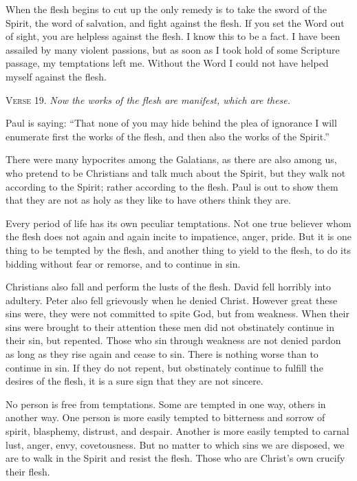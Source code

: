 When the flesh begins to cut up the only remedy is to take the sword of the Spirit, the word of salvation, and fight against the flesh. If you set the Word out of sight, you are helpless against the flesh. I know this to be a fact. I have been assailed by many violent passions, but as soon as I took hold of some Scripture passage, my temptations left me. Without the Word I could not have helped myself against the flesh.

\textsc{Verse} 19. \emph{Now the works of the flesh are manifest, which are these.}

Paul is saying: “That none of you may hide behind the plea of ignorance I will enumerate first the works of the flesh, and then also the works of the Spirit.”

There were many hypocrites among the Galatians, as there are also among us, who pretend to be Christians and talk much about the Spirit, but they walk not according to the Spirit; rather according to the flesh. Paul is out to show them that they are not as holy as they like to have others think they are.

Every period of life has its own peculiar temptations. Not one true believer whom the flesh does not again and again incite to impatience, anger, pride. But it is one thing to be tempted by the flesh, and another thing to yield to the flesh, to do its bidding without fear or remorse, and to continue in sin.

Christians also fall and perform the lusts of the flesh. David fell horribly into adultery. Peter also fell grievously when he denied Christ. However great these sins were, they were not committed to spite God, but from weakness. When their sins were brought to their attention these men did not obstinately continue in their sin, but repented. Those who sin through weakness are not denied pardon as long as they rise again and cease to sin. There is nothing worse than to continue in sin. If they do not repent, but obstinately continue to fulfill the desires of the flesh, it is a sure sign that they are not sincere.

No person is free from temptations. Some are tempted in one way, others in another way. One person is more easily tempted to bitterness and sorrow of spirit, blasphemy, distrust, and despair. Another is more easily tempted to carnal lust, anger, envy, covetousness. But no matter to which sins we are disposed, we are to walk in the Spirit and resist the flesh. Those who are Christ’s own crucify their flesh.

